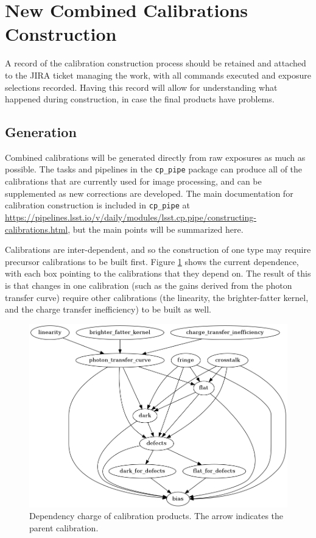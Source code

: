 \documentclass[DM,authoryear,toc]{lsstdoc}
\begin{document}
\section{New Combined Calibrations Construction}

A record of the calibration construction process should be retained and attached to the JIRA ticket managing the work, with all commands executed and exposure selections recorded.
Having this record will allow for understanding what happened during construction, in case the final products have problems.

\subsection{Generation}

Combined calibrations will be generated directly from raw exposures as much as possible.
The tasks and pipelines in the \verb|cp_pipe| package can produce all of the calibrations that are currently used for image processing, and can be supplemented as new corrections are developed.
The main documentation for calibration construction is included in \verb|cp_pipe| at \url{https://pipelines.lsst.io/v/daily/modules/lsst.cp.pipe/constructing-calibrations.html}, but the main points will be summarized here.

Calibrations are inter-dependent, and so the construction of one type may require precursor calibrations to be built first.
Figure \ref{fig:dependence} shows the current dependence, with each box pointing to the calibrations that they depend on.
The result of this is that changes in one calibration (such as the gains derived from the photon transfer curve) require other calibrations (the linearity, the brighter-fatter kernel, and the charge transfer inefficiency) to be built as well.

\begin{figure}
  \includegraphics[width=\linewidth]{figures/dependence.png}
  \caption{Dependency charge of calibration products.  The arrow indicates the parent calibration.}
  \label{fig:dependence}
\end{figure}
\end{document}
